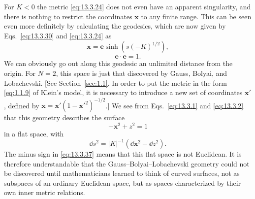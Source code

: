 For \(K<0\) the metric \eqref{eq:13.3.24} does not even have an apparent
singularity, and there is nothing to restrict the coordinates
\(\mathbf{x}\) to any finite range. This can be seen even more definitely
by calculating the geodesics, which are now given by
Eqs.~\eqref{eq:13.3.30} and \eqref{eq:13.3.24} as
\begin{equation}
  \mathbf{x}
  =
  \mathbf{e}\sinh\!\left(s(-K)^{1/2}\right),
  \tag{13.3.34}\label{eq:13.3.34}
\end{equation}
\begin{equation}
  \mathbf{e}\cdot\mathbf{e}=1.
  \tag{13.3.35}\label{eq:13.3.35}
\end{equation}
We can obviously go out along this geodesic an unlimited distance from the
origin. For \(N=2\), this space is just that discovered by Gauss, Bolyai,
and Lobachevski. [See Section~\ref{sec:1.1}. In order to put the metric in
the form \eqref{eq:1.1.9} of Klein's model, it is necessary to introduce a
new set of coordinates \(\mathbf{x}'\), defined by
\(\mathbf{x}=\mathbf{x}'(1-\mathbf{x}'^2)^{-1/2}\).] We see from
Eqs.~\eqref{eq:13.3.1} and \eqref{eq:13.3.2} that this geometry describes
the surface
\begin{equation}
  -\mathbf{x}^2+z^2=1
  \tag{13.3.36}\label{eq:13.3.36}
\end{equation}
in a flat space, with
\begin{equation}
  \dd s^2
  =
  \lvert K\rvert^{-1}
  \left(\dd\mathbf{x}^2-\dd z^2\right).
  \tag{13.3.37}\label{eq:13.3.37}
\end{equation}
The minus sign in \eqref{eq:13.3.37} means that this flat space is not
Euclidean. It is therefore understandable that the Gauss--Bolyai--Lobachevski
geometry could not be discovered until mathematicians learned to think of
curved surfaces, not as subspaces of an ordinary Euclidean space, but as
spaces characterized by their own inner metric relations.

